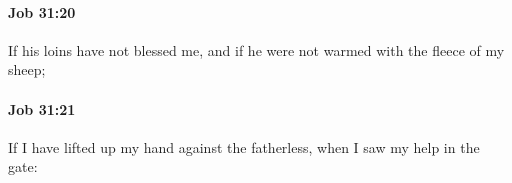 		\paragraph{Job 31:20} %
			\label{JOB-31-20}

			If his loins have not blessed me, and if he were not warmed with the fleece of my sheep;


		\paragraph{Job 31:21} %
			\label{JOB-31-21}

			If I have lifted up my hand against the fatherless, when I saw my help in the gate:


